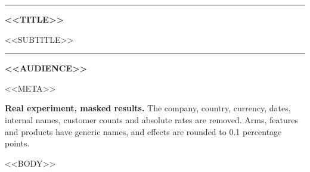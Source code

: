 \documentclass[<<FONTSIZE>>,a4paper]{article}
\renewcommand{\_}{\oldunderscore\penalty500\relax}
\begin{document}
\begin{titlepage}
\vspace*{38mm}
{\color{brand}\rule{\linewidth}{1.2pt}}\par\vspace{6mm}
{\fontsize{24}{29}\selectfont\bfseries <<TITLE>>\par}
\vspace{5mm}
{\large\color{muted} <<SUBTITLE>>\par}
\vspace{6mm}
{\color{brand}\rule{\linewidth}{1.2pt}}\par
\vspace{10mm}
{\normalsize\textbf{<<AUDIENCE>>}\par}
\vspace{4mm}
{\small\color{muted} <<META>>\par}
\vfill
\begin{warnbox}
\textbf{Real experiment, masked results.} The company, country, currency, dates, internal names,
customer counts and absolute rates are removed. Arms, features and products have generic names, and
effects are rounded to 0.1 percentage points.
\end{warnbox}
\end{titlepage}

\tableofcontents
\clearpage

<<BODY>>
\end{document}
